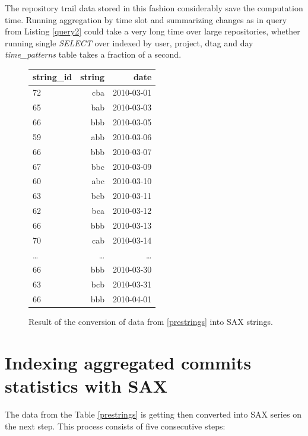 \documentclass[a4paper,10pt]{article}
\numberwithin{equation}{subsection}
\begin{document}
The repository trail data stored in this fashion considerably save the computation time. Running aggregation by time slot 
and summarizing changes as in query from Listing \ref{query2} could take a very long time over large repositories, whether running 
single \emph{SELECT} over indexed by user, project, dtag and day \emph{time\_patterns} table takes a fraction of a second.
\newpage

\begin{figure}
  \begin{center}
     \caption{Result of the conversion of data from \ref{prestrings} into SAX strings.}
     \begin{tabularx}{0.4\textwidth}{ | X | r | r |}
      \hline           
       string\_id & string & date\\ 
      \hline    
      72 & cba & 2010-03-01\\ 
      65 & bab & 2010-03-03\\ 
      66 & bbb & 2010-03-05\\ 
      59 & abb & 2010-03-06\\ 
      66 & bbb & 2010-03-07\\ 
      67 & bbc & 2010-03-09\\ 
      60 & abc & 2010-03-10\\ 
      63 & bcb & 2010-03-11\\ 
      62 & bca & 2010-03-12\\ 
      66 & bbb & 2010-03-13\\ 
      70 & cab & 2010-03-14\\ 
      \ldots & \ldots & \ldots \\ 
      66 & bbb & 2010-03-30\\ 
      63 & bcb & 2010-03-31\\ 
      66 & bbb & 2010-04-01\\
      \hline    
     \end{tabularx}
     \label{tab:strings}
  \end{center}
\end{figure}

\section{Indexing aggregated commits statistics with SAX}
The data from the Table \ref{prestrings} is getting then converted into SAX series on the next step. This process consists of 
five consecutive steps:
\end{document}
